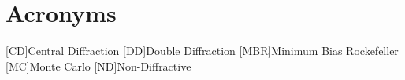 \chapter*{Acronyms}\label{chapter:acronyms}

\begin{acronym}[BRAHMS]
	[CD]{Central Diffraction}
	[DD]{Double Diffraction}
	[MBR]{Minimum Bias Rockefeller}
	[MC]{Monte Carlo}
	[ND]{Non-Diffractive}

\end{acronym}
